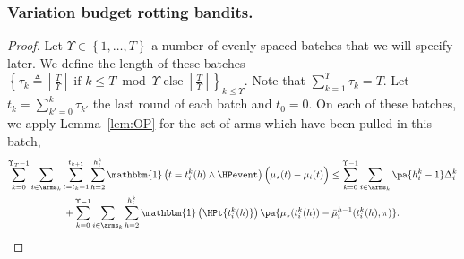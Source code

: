 \subsubsection*{Variation budget rotting bandits.}
\begin{tBox}
\restabudgettheorem* 
\end{tBox}
\begin{proof}
Let $\Upsilon \in \left\{1, \dots, T\right\}$ a number of evenly spaced batches that we will specify later. We define the length of these batches $\left\{\tau_{k} \triangleq\left\lceil\frac{T}{\Upsilon}\right\rceil \text { if } k \leq T \bmod \Upsilon \text { else }\left\lfloor\frac{T}{\Upsilon}\right\rfloor\right\}_{k \leq \Upsilon}$. Note that $\sum_{k=1}^{\Upsilon} \tau_k = T$. Let $t_k = \sum_{k'=0}^k \tau_{k'}$ the last round of each batch and $t_0 = 0$. On each of these batches, we apply Lemma~\ref{lem:OP} for the set of arms which have been pulled in this batch,
\begin{multline}
\label{eq:op_decomposition}
    \sum_{k=0}^{\Upsilon_T-1} \sum_{i\in\arms_k}\sum_{t=t_{k}+1}^{t_{k+1}} \sum_{h=2}^{h_{t}^{k}} \mathbbm{1}\left( t=t_{i}^{k}(h) \land \HPevent\right)\Big(\mu_{\star}(t)-\mu_{i}(t)\Big)
\leq \sum_{k=0}^{\Upsilon-1} \sum_{i\in\arms_k} \pa{h_i^k-1}\Delta_i^k\\
+ \sum_{k=0}^{\Upsilon-1} \sum_{i\in\arms_k}\sum_{h=2}^{h^k_{i}}\mathbbm{1}\left(\HPt{t_i^k(h)}\right)\pa{  \mu_{\star}(t_i^k(h)) - \bar{\mu}_i^{h-1}(t_i^k(h), \pi)}.
\end{multline}


\end{proof}
